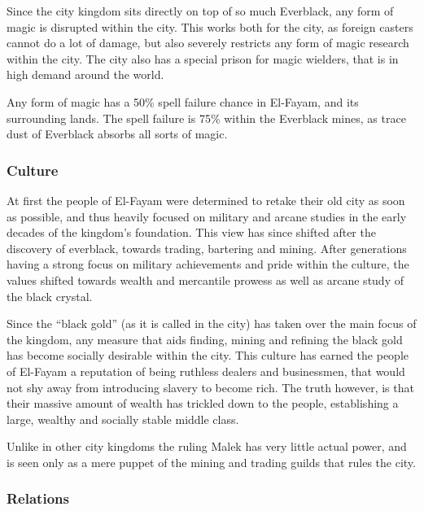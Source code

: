 Since the city kingdom sits directly on top of so much Everblack, any form
of magic is disrupted within the city. This works both for the city, as
foreign casters cannot do a lot of damage, but also severely restricts any
form of magic research within the city. The city also has a special prison
for magic wielders, that is in high demand around the world.

\begin{note}
  Any form of magic has a 50\% spell failure chance in El-Fayam, and its
  surrounding lands. The spell failure is 75\% within the Everblack mines,
  as trace dust of Everblack absorbs all sorts of magic.
\end{note}

\subsubsection{Culture}

At first the people of El-Fayam were determined to retake their old city as
soon as possible, and thus heavily focused on military and arcane studies in
the early decades of the kingdom's foundation. This view has since shifted after
the discovery of everblack, towards trading, bartering and mining. After
generations having a strong focus on military achievements and pride within
the culture, the values shifted towards wealth and mercantile prowess as well
as arcane study of the black crystal.

Since the ``black gold'' (as it is called in the city) has taken over the main
focus of the kingdom, any measure that aids finding, mining and refining the
black gold has become socially desirable within the city. This culture has
earned the people of El-Fayam a reputation of being ruthless dealers and
businessmen, that would not shy away from introducing slavery to become rich.
The truth however, is that their massive amount of wealth has trickled down
to the people, establishing a large, wealthy and socially stable middle class.

Unlike in other city kingdoms the ruling Malek has very little actual power,
and is seen only as a mere puppet of the mining and trading guilds that
rules the city.


\subsubsection{Relations}


